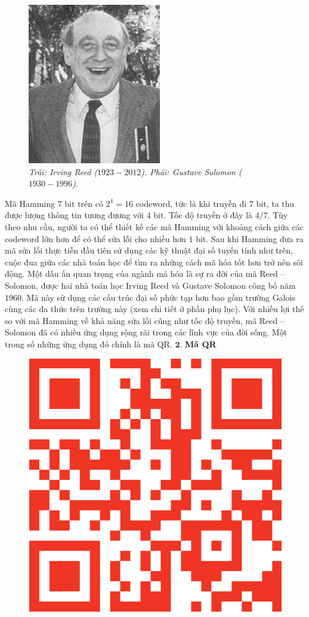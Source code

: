 \begin{multicols}{2}
\begin{figure}[H]
		\includegraphics[height= 0.575\linewidth]{3}
		\caption{\small\textit{\color{toanhocdoisong}Trái: Irving Reed ($1923 - 2012$). Phải: Gustave Solomon ($1930 - 1996$).}}
		\vspace*{-10pt}
	\end{figure}
	Mã Hamming $7$ bit trên có $2^4=16$ codeword, tức là khi truyền đi $7$ bit, ta thu được lượng thông tin tương đương với $4$ bit. Tốc độ truyền ở đây là $4/7$. Tùy theo nhu cầu, người ta có thể thiết kế các mã Hamming với khoảng cách giữa các codeword lớn hơn để có thể sửa lỗi cho nhiều hơn $1$ bit.
	\vskip 0.05cm
	Sau khi Hamming đưa ra mã sửa lỗi thực tiễn đầu tiên sử dụng các kỹ thuật đại số tuyến tính như trên, cuộc đua giữa các nhà toán học để tìm ra những cách mã hóa tốt hơn trở nên sôi động. Một dấu ấn quan trọng của ngành mã hóa là sự ra đời của mã Reed -- Solomon, được hai nhà toán học Irving Reed và Gustave Solomon công bố năm $1960$. Mã này sử dụng các cấu trúc đại số phức tạp hơn bao gồm trường Galois cùng các đa thức trên trường này (xem chi tiết ở phần phụ lục). Với nhiều lợi thế so với mã Hamming về khả năng sửa lỗi cũng như tốc độ truyền, mã Reed -- Solomon đã có nhiều ứng dụng rộng rãi trong các lĩnh vực của đời sống. Một trong số những ứng dụng đó chính là mã QR. 
	\vskip 0.05cm
	$\pmb{2.}$ \textbf{\color{toanhocdoisong}\color{toanhocdoisong}Mã QR}
	\begin{figure}[H]
			\vspace*{-5pt}
			\centering
			\captionsetup{labelformat= empty, justification=centering}
			\includegraphics[width= 0.7\linewidth]{QR}

\end{figure}
\end{multicols}
